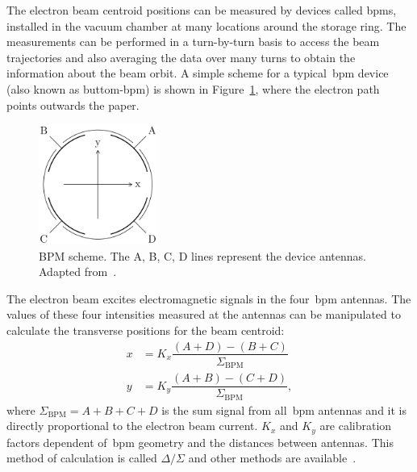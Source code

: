 The electron beam centroid positions can be measured by devices called \glspl{bpm}, installed in the vacuum chamber at many locations around the storage ring. The measurements can be performed in a turn-by-turn basis to access the beam trajectories and also averaging the data over many turns to obtain the information about the beam orbit. A simple scheme for a typical~\gls{bpm} device (also known as buttom-\gls{bpm}) is shown in Figure~\ref{fig:bpm_scheme}, where the electron path points outwards the paper.
\begin{figure}
    \centering
    \includegraphics[width=0.35\textwidth]{figures/bpm_scheme.png}
    \caption{BPM scheme. The A, B, C, D lines represent the device antennas. Adapted from~\cite{huang2019beam}.}
    \label{fig:bpm_scheme}
\end{figure}

The electron beam excites electromagnetic signals in the four~\gls{bpm} antennas. The values of these four intensities measured at the antennas can be manipulated to calculate the transverse positions for the beam centroid:
\begin{align}
    x &= K_x \dfrac{\left(A + D\right) - \left(B + C\right)}{\Sigma_{\mathrm{BPM}}} \\
    y &= K_y \dfrac{\left(A + B\right) - \left(C + D\right)}{\Sigma_{\mathrm{BPM}}},
\end{align}
where $\Sigma_{\mathrm{BPM}} = A + B + C + D$ is the sum signal from all~\gls{bpm} antennas and it is directly proportional to the electron beam current. $K_x$ and $K_y$ are calibration factors dependent of~\gls{bpm} geometry and the distances between antennas. This method of calculation is called $\Delta/\Sigma$ and other methods are available~\cite{wikibpm}.

